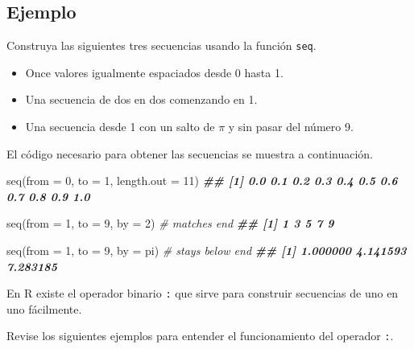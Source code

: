 \documentclass[
]{book}
\makeatletter
\newenvironment{Shaded}{\begin{snugshade}}{\end{snugshade}}
\newcommand{\AttributeTok}[1]{\textcolor[rgb]{0.77,0.63,0.00}{#1}}
\newcommand{\CommentTok}[1]{\textcolor[rgb]{0.56,0.35,0.01}{\textit{#1}}}
\newcommand{\DecValTok}[1]{\textcolor[rgb]{0.00,0.00,0.81}{#1}}
\newcommand{\DocumentationTok}[1]{\textcolor[rgb]{0.56,0.35,0.01}{\textbf{\textit{#1}}}}
\newcommand{\FunctionTok}[1]{\textcolor[rgb]{0.00,0.00,0.00}{#1}}
\newcommand{\NormalTok}[1]{#1}
\providecommand{\tightlist}{%
  \setlength{\itemsep}{0pt}\setlength{\parskip}{0pt}}
\newenvironment{kframe}{%
\medskip{}
\setlength{\fboxsep}{.8em}
 \def\at@end@of@kframe{}%
 \ifinner\ifhmode%
  \def\at@end@of@kframe{\end{minipage}}%
  \begin{minipage}{\columnwidth}%
 \fi\fi%
 \def\FrameCommand##1{\hskip\@totalleftmargin \hskip-\fboxsep
 \colorbox{shadecolor}{##1}\hskip-\fboxsep
     \hskip-\linewidth \hskip-\@totalleftmargin \hskip\columnwidth}%
 \MakeFramed {\advance\hsize-\width
   \@totalleftmargin\z@ \linewidth\hsize
   \@setminipage}}%
 {\par\unskip\endMakeFramed%
 \at@end@of@kframe}
\newenvironment{rmdblock}[1]
  {
  \begin{itemize}
  \renewcommand{\labelitemi}{
    \raisebox{-.7\height}[0pt][0pt]{
      {\setkeys{Gin}{width=3em,keepaspectratio}\texttt{[image: images/\#1]}}
    }
  }
  \setlength{\fboxsep}{1em}
  \begin{kframe}
  \item
  }
  {
  \end{kframe}
  \end{itemize}
  }
\newenvironment{rmdnote}
  {\begin{rmdblock}{note}}
  {\end{rmdblock}}
\makeatother
\begin{document}
\hypertarget{ejemplo-10}{%
\subsection*{Ejemplo}\label{ejemplo-10}}

Construya las siguientes tres secuencias usando la función \texttt{seq}.

\begin{itemize}
\tightlist
\item
  Once valores igualmente espaciados desde 0 hasta 1.
\item
  Una secuencia de dos en dos comenzando en 1.
\item
  Una secuencia desde 1 con un salto de \(\pi\) y sin pasar del número 9.
\end{itemize}

El código necesario para obtener las secuencias se muestra a continuación.

\begin{Shaded}
\begin{Highlighting}[]
\FunctionTok{seq}\NormalTok{(}\AttributeTok{from =} \DecValTok{0}\NormalTok{, }\AttributeTok{to =} \DecValTok{1}\NormalTok{, }\AttributeTok{length.out =} \DecValTok{11}\NormalTok{)}
\DocumentationTok{\#\#  [1] 0.0 0.1 0.2 0.3 0.4 0.5 0.6 0.7 0.8 0.9 1.0}

\FunctionTok{seq}\NormalTok{(}\AttributeTok{from =} \DecValTok{1}\NormalTok{, }\AttributeTok{to =} \DecValTok{9}\NormalTok{, }\AttributeTok{by =} \DecValTok{2}\NormalTok{)  }\CommentTok{\# matches \textquotesingle{}end\textquotesingle{}}
\DocumentationTok{\#\# [1] 1 3 5 7 9}

\FunctionTok{seq}\NormalTok{(}\AttributeTok{from =} \DecValTok{1}\NormalTok{, }\AttributeTok{to =} \DecValTok{9}\NormalTok{, }\AttributeTok{by =}\NormalTok{ pi) }\CommentTok{\# stays below \textquotesingle{}end\textquotesingle{}}
\DocumentationTok{\#\# [1] 1.000000 4.141593 7.283185}
\end{Highlighting}
\end{Shaded}

\begin{rmdnote}
En R existe el operador binario \texttt{:} que sirve para construir secuencias de uno en uno fácilmente.
\end{rmdnote}

Revise los siguientes ejemplos para entender el funcionamiento del operador \texttt{:}.
\end{document}
